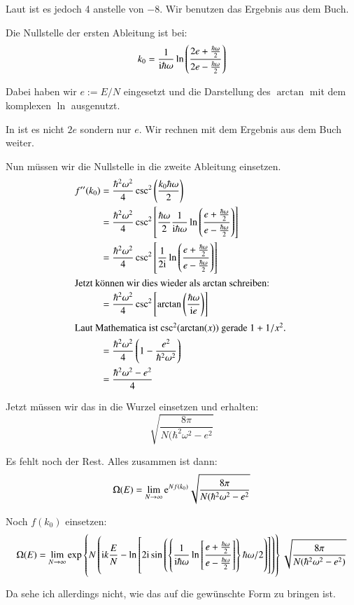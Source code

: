 Laut \cite[Abschnitt~2.2.3.1]{Schwabl/Statistische_Mechanik} ist es jedoch 4 anstelle von $-8$. Wir benutzen das Ergebnis aus dem Buch.

Die Nullstelle der ersten Ableitung ist bei:
\[
    k_0 = \frac{1}{\iup\hbar\omega} \ln\del{\frac{2e + \frac{\hbar\omega}2}{2e - \frac{\hbar\omega}2}}
\]

Dabei haben wir $e := E/N$ eingesetzt und die Darstellung des $\arctan$ mit dem
komplexen $\ln$ ausgenutzt.

In \cite[Formel~2.2.28]{Schwabl/Statistische_Mechanik} ist es nicht $2e$ sondern nur $e$. Wir rechnen mit dem Ergebnis aus dem Buch weiter.

Nun müssen wir die Nullstelle in die zweite Ableitung einsetzen.
\begin{align*}
    f''(k_0)
    &= \frac{\hbar^2 \omega^2}4 \csc^2\del{\frac{k_0 \hbar\omega}2} \\
    &= \frac{\hbar^2 \omega^2}4 \csc^2\sbr{\frac{\hbar\omega}2\frac{1}{\iup\hbar\omega} \ln\del{\frac{e + \frac{\hbar\omega}2}{e - \frac{\hbar\omega}2}}} \\
    &= \frac{\hbar^2 \omega^2}4 \csc^2\sbr{\frac{1}{2\iup} \ln\del{\frac{e + \frac{\hbar\omega}2}{e - \frac{\hbar\omega}2}}} \\
    \intertext{%
        Jetzt können wir dies wieder als $\arctan$ schreiben:
    }
    &= \frac{\hbar^2 \omega^2}4 \csc^2\sbr{ \arctan\del{\frac{\hbar\omega}{\iup e}}} \\
    \intertext{%
        Laut Mathematica ist $\csc^2(\arctan(x))$ gerade $1 + 1/x^2$.
    }
    &= \frac{\hbar^2 \omega^2}4 \del{1 - \frac{e^2}{\hbar^2\omega^2}} \\
    &= \frac{\hbar^2 \omega^2 - e^2}4
\end{align*}

Jetzt müssen wir das in die Wurzel einsetzen und erhalten:
\[
    \sqrt{\frac{8 \pi}{N (\hbar^2 \omega^2 - e^2}}
\]

Es fehlt noch der Rest. Alles zusammen ist dann:
\[
    \Omega(E) = \lim_{N \to \infty} \mathrm e^{N f(k_0)} \sqrt{\frac{8 \pi}{N (\hbar^2 \omega^2 - e^2}}
\]

Noch $f(k_0)$ einsetzen:
\[
    \Omega(E) = \lim_{N \to \infty}
    \exp\cbr{
        N 
        \del{
            \iup k \frac EN - \ln\sbr{
                2\iup \sin\del{
                    \cbr{
                        \frac{1}{\iup\hbar\omega}
                        \ln\sbr{
                            \frac{e + \frac{\hbar\omega}2}{e - \frac{\hbar\omega}2}
                        }
                    }
                    \hbar\omega/2
                }
            }
        }
    }
    \sqrt{\frac{8 \pi}{N (\hbar^2 \omega^2 - e^2)}}
\]

Da sehe ich allerdings nicht, wie das auf die gewünschte Form zu bringen ist.

\printbibliography


